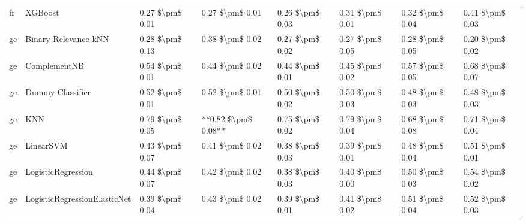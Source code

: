 \begin{tabular}{llllllll}
      fr &                         XGBoost &     0.27 \$\textbackslash pm\$ 0.01 &           0.27 \$\textbackslash pm\$ 0.01 &       0.26 \$\textbackslash pm\$ 0.03 &        0.31 \$\textbackslash pm\$ 0.01 &                         0.32 \$\textbackslash pm\$ 0.04 &     0.41 \$\textbackslash pm\$ 0.03 \\
      ge &            Binary Relevance kNN &     0.28 \$\textbackslash pm\$ 0.13 &           0.38 \$\textbackslash pm\$ 0.02 &       0.27 \$\textbackslash pm\$ 0.02 &        0.27 \$\textbackslash pm\$ 0.05 &                         0.28 \$\textbackslash pm\$ 0.05 &     0.20 \$\textbackslash pm\$ 0.02 \\
      ge &                    ComplementNB &     0.54 \$\textbackslash pm\$ 0.01 &           0.44 \$\textbackslash pm\$ 0.02 &       0.44 \$\textbackslash pm\$ 0.01 &        0.45 \$\textbackslash pm\$ 0.02 &                         0.57 \$\textbackslash pm\$ 0.05 &     0.68 \$\textbackslash pm\$ 0.07 \\
      ge &                Dummy Classifier &     0.52 \$\textbackslash pm\$ 0.01 &           0.52 \$\textbackslash pm\$ 0.01 &       0.50 \$\textbackslash pm\$ 0.02 &        0.50 \$\textbackslash pm\$ 0.03 &                         0.48 \$\textbackslash pm\$ 0.03 &     0.48 \$\textbackslash pm\$ 0.03 \\
      ge &                             KNN &     0.79 \$\textbackslash pm\$ 0.05 &       **0.82 \$\textbackslash pm\$ 0.08** &       0.75 \$\textbackslash pm\$ 0.02 &        0.79 \$\textbackslash pm\$ 0.04 &                         0.68 \$\textbackslash pm\$ 0.08 &     0.71 \$\textbackslash pm\$ 0.04 \\
      ge &                       LinearSVM &     0.43 \$\textbackslash pm\$ 0.07 &           0.41 \$\textbackslash pm\$ 0.02 &       0.38 \$\textbackslash pm\$ 0.03 &        0.39 \$\textbackslash pm\$ 0.01 &                         0.48 \$\textbackslash pm\$ 0.04 &     0.51 \$\textbackslash pm\$ 0.01 \\
      ge &              LogisticRegression &     0.44 \$\textbackslash pm\$ 0.07 &           0.42 \$\textbackslash pm\$ 0.02 &       0.38 \$\textbackslash pm\$ 0.03 &        0.40 \$\textbackslash pm\$ 0.00 &                         0.50 \$\textbackslash pm\$ 0.03 &     0.54 \$\textbackslash pm\$ 0.02 \\
      ge &    LogisticRegressionElasticNet &     0.39 \$\textbackslash pm\$ 0.04 &           0.43 \$\textbackslash pm\$ 0.02 &       0.39 \$\textbackslash pm\$ 0.01 &        0.41 \$\textbackslash pm\$ 0.02 &                         0.51 \$\textbackslash pm\$ 0.04 &     0.52 \$\textbackslash pm\$ 0.03 \\

\end{tabular}
